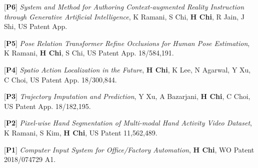 \begin{cventries}
{\begin{cvitems}
\item {[\textbf{P6}] \textit{System and Method for Authoring Context-augmented Reality Instruction through Generative Artificial Intelligence},\newline
        \hspace{1.8em} K Ramani, S Chi, \textbf{H Chi}, R Jain, J Shi, US Patent App.}
\item {[\textbf{P5}] \textit{Pose Relation Transformer Refine Occlusions for Human Pose Estimation},\newline
        \hspace{1.8em} K Ramani, \textbf{H Chi}, S Chi, US Patent App. 18/584,191.}
\item {[\textbf{P4}] \textit{Spatio Action Localization in the Future}, \newline
        \hspace{1.8em}\textbf{H Chi}, K Lee, N Agarwal, Y Xu, C Choi, US Patent App. 18/300,844.}
\item {[\textbf{P3}] \textit{Trajectory Imputation and Prediction},\newline
        \hspace{1.8em} Y Xu, A Bazarjani, \textbf{H Chi}, C Choi, US Patent App. 18/182,195. }
\item {[\textbf{P2}] \textit{Pixel-wise Hand Segmentation of Multi-modal Hand Activity Video Dataset},\newline
        \hspace{1.8em} K Ramani, S Kim, \textbf{H Chi},  US Patent 11,562,489.}
\item {[\textbf{P1}] \textit{Computer Input System for Office/Factory Automation}, \newline
        \hspace{1.8em}\textbf{H Chi}, WO Patent 2018/074729 A1.}
\end{cvitems}
}


\end{cventries}
